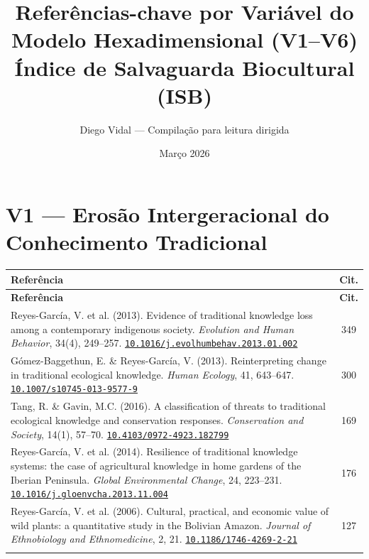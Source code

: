\documentclass[a4paper,11pt]{article}
\title{\textbf{Referências-chave por Variável do Modelo Hexadimensional (V1--V6)}\\[6pt]
\large Índice de Salvaguarda Biocultural (ISB)}
\author{Diego Vidal --- Compilação para leitura dirigida}
\date{Março 2026}
\newcommand{\doi}[1]{\href{https://doi.org/#1}{\texttt{#1}}}
\begin{document}
\maketitle
\tableofcontents
\newpage

\section{V1 --- Erosão Intergeracional do Conhecimento Tradicional}

\begin{longtable}{>{\raggedright\arraybackslash}p{} c}
\toprule
\textbf{Referência} & \textbf{Cit.} \\
\midrule
\endfirsthead
\toprule
\textbf{Referência} & \textbf{Cit.} \\
\midrule
\endhead

Reyes-García, V. et al. (2013). Evidence of traditional knowledge loss among a contemporary indigenous society. \textit{Evolution and Human Behavior}, 34(4), 249--257.\newline
\doi{10.1016/j.evolhumbehav.2013.01.002} & 349 \\
\addlinespace

Gómez-Baggethun, E. \& Reyes-García, V. (2013). Reinterpreting change in traditional ecological knowledge. \textit{Human Ecology}, 41, 643--647.\newline
\doi{10.1007/s10745-013-9577-9} & 300 \\
\addlinespace

Tang, R. \& Gavin, M.C. (2016). A classification of threats to traditional ecological knowledge and conservation responses. \textit{Conservation and Society}, 14(1), 57--70.\newline
\doi{10.4103/0972-4923.182799} & 169 \\
\addlinespace

Reyes-García, V. et al. (2014). Resilience of traditional knowledge systems: the case of agricultural knowledge in home gardens of the Iberian Peninsula. \textit{Global Environmental Change}, 24, 223--231.\newline
\doi{10.1016/j.gloenvcha.2013.11.004} & 176 \\
\addlinespace

Reyes-García, V. et al. (2006). Cultural, practical, and economic value of wild plants: a quantitative study in the Bolivian Amazon. \textit{Journal of Ethnobiology and Ethnomedicine}, 2, 21.\newline
\doi{10.1186/1746-4269-2-21} & 127 \\
\addlinespace


\end{longtable}
\end{document}

